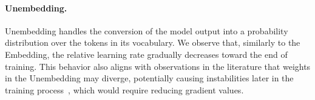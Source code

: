 \documentclass{article} %
\begin{document}
    \paragraph{Unembedding.} 
    Unembedding handles the conversion of the model output into a probability distribution over the tokens in its vocabulary.
    We observe that, similarly to the Embedding, the relative learning rate gradually decreases toward the end of training. This behavior also aligns with observations in the literature that weights in the Unembedding may diverge, potentially causing instabilities later in the training process~\citep{chowdhery2022palm, zoph2022st}, which would require reducing gradient values. 
\end{document}
